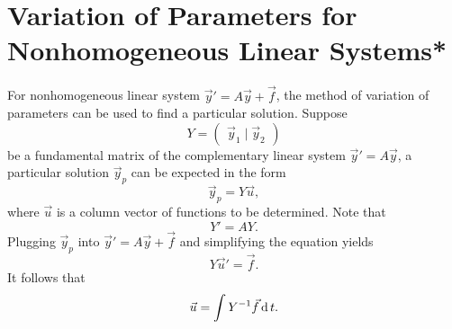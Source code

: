 \section{Variation of Parameters for Nonhomogeneous Linear Systems*}

For nonhomogeneous linear system $\vec{y}'=A\vec{y}+\vec{f}$, the method of variation of parameters can be used to find a particular solution. Suppose
\[
Y=\begin{pmatrix}
  \vec{y}_1 \mid \vec{y}_2
\end{pmatrix}  
\]
be a fundamental matrix of the complementary linear system $\vec{y}'=A\vec{y}$, a particular solution $\vec{y}_p$ can be expected in the form
\[
\vec{y}_p=Y\vec{u},  
\]
where $\vec{u}$ is a column vector of functions to be determined. Note that
\[Y'=AY.\]
Plugging $\vec{y}_p$ into $\vec{y}'=A\vec{y}+\vec{f}$ and simplifying the equation yields
\[Y\vec{u}'=\vec{f}.\]
It follows that
\[
\vec{u}=\int Y^{-1}\vec{f} \operatorname{d} t.  
\]

